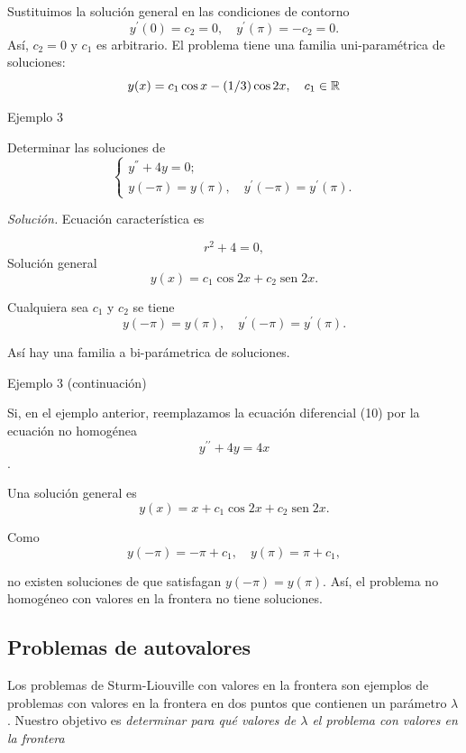 Sustituimos la solución general en las condiciones de contorno
$$
y^{\prime}(0)=c_{2}=0, \quad y^{\prime}(\pi)=-c_{2}=0 .
$$
Así, $c_{2}=0$ y $c_{1}$ es arbitrario. El problema  tiene una familia uni-paramétrica de soluciones:
$$
y(x)=c_{1} \cos x-(1 / 3) \cos 2 x,\quad c_1\in\mathbb{R}
$$




{Ejemplo 3}

Determinar las soluciones de
\[
 \left\{
        \begin{array}{l}
                     y^{''}+4 y=0;\\
                     y(-\pi)=y(\pi), \quad y^{\prime}(-\pi)=y^{\prime}(\pi).
        \end{array}
 \right.
\]    


\emph{Solución.} Ecuación característica es 

$$r^{2}+4=0,$$ 
Solución general
$$y(x)=c_{1} \cos 2 x+c_{2} \operatorname{sen} 2 x.$$

Cualquiera sea $c_1$ y $c_2$ se tiene  
$$y(-\pi)=y(\pi),\quad  y^{\prime}(-\pi)=y^{\prime}(\pi).$$ 

Así  hay una familia a bi-parámetrica de soluciones.




{Ejemplo 3 (continuación)}

Si, en el ejemplo anterior, reemplazamos la ecuación diferencial (10) por la ecuación no homogénea
$$y^{\prime \prime}+4 y=4 x$$.

Una solución general es
$$y(x)=x+c_{1} \cos 2 x+c_{2} \operatorname{sen} 2 x.$$

Como 
$$y(-\pi)=-\pi+c_{1},\quad y(\pi)=\pi+c_{1},$$ 

no existen soluciones de  que satisfagan $y(-\pi)=y(\pi)$. Así, el problema no homogéneo con valores en la frontera  no tiene soluciones.



\subsection{Problemas de autovalores}
 
 

 
Los problemas de Sturm-Liouville con valores en la frontera   son ejemplos de problemas con valores en la frontera en dos puntos que contienen un parámetro $\lambda$. Nuestro objetivo es \emph{determinar para qué valores de $\lambda$   el problema con valores en la frontera}


